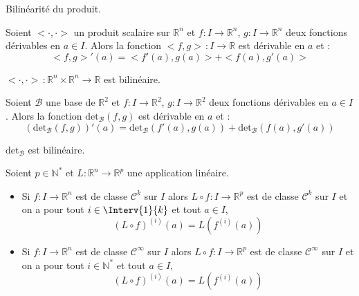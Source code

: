 \documentclass[a4paper,10pt]{report}
\begin{document}
\begin{preuve} Bilinéarité du produit.
\end{preuve}

\begin{cor} Soient $< \cdot , \cdot>$ un produit scalaire sur $\mathbb{R}^n$ et $f: I \rightarrow \mathbb{R}^n$, $g : I \rightarrow \mathbb{R}^n$ deux fonctions dérivables en $a \in I$. Alors la fonction $<f,g> \, :  I \rightarrow \mathbb{R}$ est dérivable en $a$ et :
$$ <f,g>'(a) = <f'(a),g(a)>+<f(a),g'(a)>$$
\end{cor}

\begin{preuve} $< \cdot , \cdot> \, : \mathbb{R}^n \times \mathbb{R}^n \rightarrow \mathbb{R}$ est bilinéaire.
\end{preuve}
%


\begin{cor} Soient $\mathcal{B}$ une base de  $\mathbb{R}^2$ et $f: I \rightarrow \mathbb{R}^2$, $g : I \rightarrow \mathbb{R}^2$ deux fonctions dérivables en $a \in I$. Alors la fonction $\textrm{det}_{\mathcal{B}}(f,g)$ est dérivable en $a$ et :
$$ (\textrm{det}_{\mathcal{B}}(f,g))'(a) = \textrm{det}_{\mathcal{B}}(f'(a),g(a)) + \textrm{det}_{\mathcal{B}}(f(a),g'(a))$$
\end{cor}

\begin{preuve} $\textrm{det}_{\mathcal{B}}$ est bilinéaire.
\end{preuve}

\begin{prop}
Soient $p \in \mathbb{N}^*$ et $L : \mathbb{R}^n \rightarrow \mathbb{R}^p$ une application linéaire. 
\begin{itemize}
\item Si $f : I \rightarrow \mathbb{R}^n$ est de classe $\mathcal{C}^k$ sur $I$ alors $L \circ f : I \rightarrow \mathbb{R}^p$ est de classe $\mathcal{C}^k$ sur $I$ et on a pour tout $i \in \Interv{1}{k}$ et tout $a \in I$,
$$ (L \circ f)^{(i)}(a) = L (f^{(i)}(a))$$
\item  Si $f : I \rightarrow \mathbb{R}^n$ est de classe $\mathcal{C}^{\infty}$ sur $I$ alors $L \circ f : I \rightarrow \mathbb{R}^p$ est de classe $\mathcal{C}^{\infty}$ sur $I$ et on a pour tout $i \in \mathbb{N}^*$ et tout $a \in I$,
$$ (L \circ f)^{(i)}(a) = L (f^{(i)}(a))$$
\end{itemize}
\end{prop}
\end{document}
